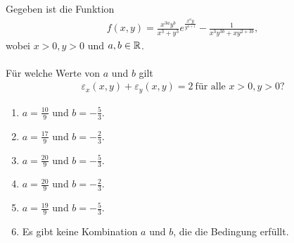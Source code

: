 \subsection*{}
Gegeben ist die Funktion
\begin{align*}
	f(x,y)
	=
	\frac{x^{3a} y^b}{x^3 +y^3} e^{\frac{x^a y}{y^{a+1}}}
	- 
	\frac{1}{x^3 y^{3b} + x y^{2 + 3b}},
\end{align*}
wobei $ x > 0, y > 0 $ und $ a,b \in \mathbb{R} $.\\
\\
Für welche Werte von $ a $ und $ b $ gilt
\begin{align*}
	\varepsilon_x(x,y) + \varepsilon_y(x,y) = 2 \ \textrm{für alle } x>0, y>0\textrm{?}
\end{align*}
\renewcommand{\labelenumi}{(\alph{enumi})}
\begin{enumerate}
	\item 
	$a = \frac{10}{9}$ und $ b=-\frac{5}{3} $.
	\item
	$a = \frac{17}{9}$ und $ b=-\frac{2}{3} $.
	\item
	$a = \frac{20}{9}$ und $ b=-\frac{5}{3} $.
	\item
	$a = \frac{20}{9}$ und $ b=-\frac{2}{3} $.
	\item
	$a = \frac{19}{9}$ und $ b=-\frac{5}{3} $.
	\item
	Es gibt keine Kombination $ a $ und $ b $, die die Bedingung erfüllt.
\end{enumerate}